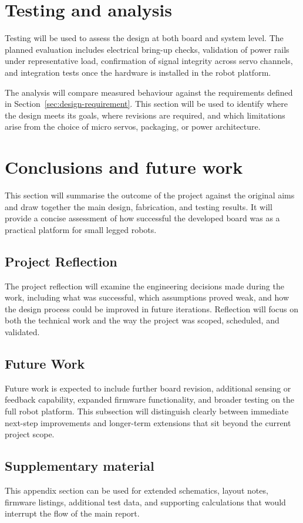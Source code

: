 \section{Testing and analysis}

Testing will be used to assess the design at both board and system level. The planned evaluation includes electrical bring-up checks, validation of power rails under representative load, confirmation of signal integrity across servo channels, and integration tests once the hardware is installed in the robot platform.

The analysis will compare measured behaviour against the requirements defined in Section~\ref{sec:design-requirement}. This section will be used to identify where the design meets its goals, where revisions are required, and which limitations arise from the choice of micro servos, packaging, or power architecture.

\section{Conclusions and future work}

This section will summarise the outcome of the project against the original aims and draw together the main design, fabrication, and testing results. It will provide a concise assessment of how successful the developed board was as a practical platform for small legged robots.

\subsection{Project Reflection}
The project reflection will examine the engineering decisions made during the work, including what was successful, which assumptions proved weak, and how the design process could be improved in future iterations. Reflection will focus on both the technical work and the way the project was scoped, scheduled, and validated.

\subsection{Future Work}
Future work is expected to include further board revision, additional sensing or feedback capability, expanded firmware functionality, and broader testing on the full robot platform. This subsection will distinguish clearly between immediate next-step improvements and longer-term extensions that sit beyond the current project scope.

\printbibliography[heading=bibintoc,title={References}]

\begin{uomappendix}
\section{Supplementary material}
This appendix section can be used for extended schematics, layout notes, firmware listings, additional test data, and supporting calculations that would interrupt the flow of the main report.
\end{uomappendix}


